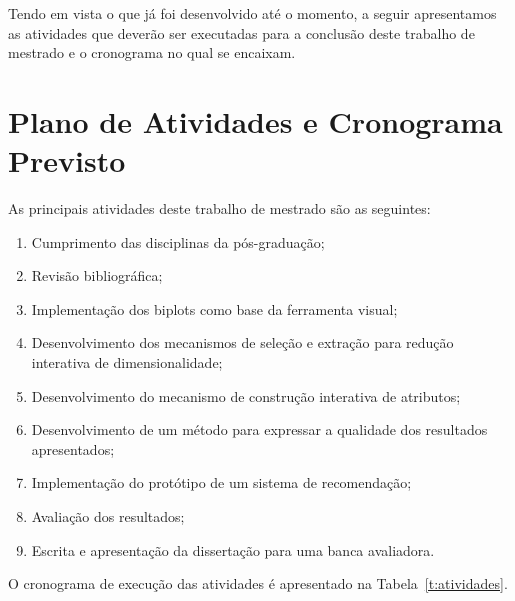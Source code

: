 Tendo em vista o que já foi desenvolvido até o momento, a
seguir apresentamos as atividades que deverão ser executadas
para a conclusão deste trabalho de mestrado e o cronograma
no qual se encaixam.

\section{Plano de Atividades e Cronograma Previsto}\label{sec:cronograma}

As principais atividades deste trabalho de mestrado são as seguintes:

\begin{enumerate}
    \item Cumprimento das disciplinas da pós-graduação;

    \item Revisão bibliográfica;

    \item Implementação dos biplots como base da
        ferramenta visual;

    \item Desenvolvimento dos mecanismos de seleção e
        extração para redução interativa de
        dimensionalidade;

    \item Desenvolvimento do mecanismo de construção
        interativa de atributos;

    \item Desenvolvimento de um método para expressar
        a qualidade dos resultados apresentados;

    \item Implementação do protótipo de um sistema de
        recomendação;

    \item Avaliação dos resultados;

    \item Escrita e apresentação da dissertação para uma banca
        avaliadora. 
\end{enumerate}

O cronograma de execução das atividades é apresentado na Tabela~\ref{t:atividades}. 

\newcommand{\y}{\color{black}\rule{35pt}{7pt}}
\newcommand{\x}{\hspace*{35pt}}
\renewcommand{\r}{\color{cinza}\rule{35pt}{7pt}}
\setlength{\tabcolsep}{0pt}

